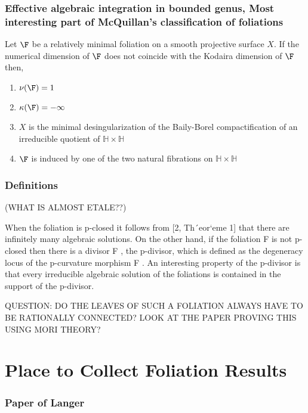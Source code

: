 \documentclass[12pt]{article}
\begin{document}
\subsubsection{Effective algebraic integration in bounded genus, Most interesting part of McQuillan's classification of foliations}

\newcommand{\HH}{\mathbb{H}}

\begin{theorem}
Let $\F$ be a relatively minimal foliation on a smooth projective surface $X$. If the numerical dimension of $\F$ does not coincide with the Kodaira dimension of $\F$ then,
\begin{enumerate}
\item $\nu(\F) = 1$
\item $\kappa(\F) = -\infty$
\item $X$ is the minimal desingularization of the Baily-Borel compactification of an irreducible quotient of $\HH \times \HH$ 
\item $\F$ is induced by one of the two natural fibrations on $\HH \times \HH$
\end{enumerate}
\end{theorem}

\subsubsection{Definitions}

(WHAT IS ALMOST ETALE??)

When the foliation is p-closed it follows from [2, Th´eor`eme 1] that there are infinitely
many algebraic solutions. On the other hand, if the foliation F is not p-closed then there
is a divisor F , the p-divisor, which is defined as the degeneracy locus of the p-curvature
morphism F . An interesting property of the p-divisor is that every irreducible algebraic
solution of the foliations is contained in the support of the p-divisor.


QUESTION: DO THE LEAVES OF SUCH A FOLIATION ALWAYS HAVE TO BE RATIONALLY CONNECTED? LOOK AT THE PAPER PROVING THIS USING MORI THEORY?

\section{Place to Collect Foliation Results}

\subsubsection{Paper of Langer}
\end{document}
